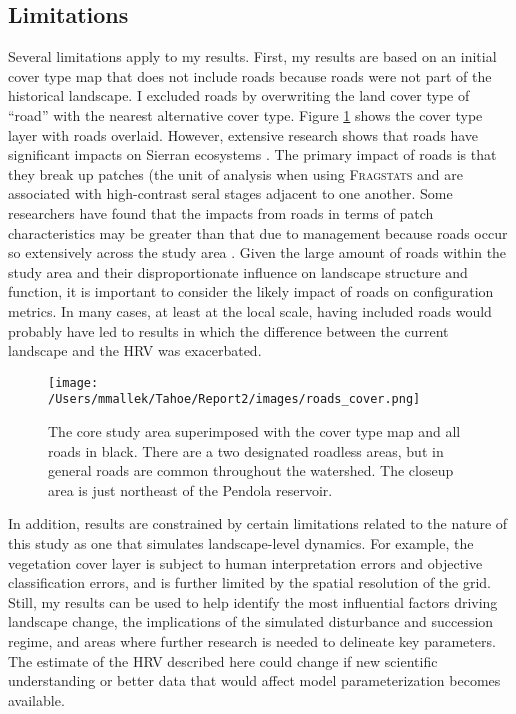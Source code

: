 \subsection{Limitations}
Several limitations apply to my results. First, my results are based on an initial cover type map that does not include roads because roads were not part of the historical landscape. I excluded roads by overwriting the land cover type of ``road'' with the nearest alternative cover type. Figure \ref{fig:roadcovermap} shows the cover type layer with roads overlaid. However, extensive research shows that roads have significant impacts on Sierran ecosystems \citep{Karr2004,Trombulak2000,Gucinski2001,Theobald2011}. The primary impact of roads is that they break up patches (the unit of analysis when using \textsc{Fragstats} and are associated with high-contrast seral stages adjacent to one another. Some researchers have found that the impacts from roads in terms of patch characteristics may be greater than that due to management because roads occur so extensively across the study area \citep{Gucinski2001,Tinker1998,Mcgarigal2001}. Given the large amount of roads within the study area and their disproportionate influence on landscape structure and function, it is important to consider the likely impact of roads on configuration metrics. In many cases, at least at the local scale, having included roads would probably have led to results in which the difference between the current landscape and the HRV was exacerbated.
%
\begin{figure}[!htbp]
  \centering
  \texttt{[image: /Users/mmallek/Tahoe/Report2/images/roads\_cover.png]}
  \caption{The core study area superimposed with the cover type map and all roads in black. There are a two designated roadless areas, but in general roads are common throughout the watershed. The closeup area is just northeast of the Pendola reservoir.} 
  \label{fig:roadcovermap}
\end{figure}
%

In addition, results are constrained by certain limitations related to the nature of this study as one that simulates landscape-level dynamics. For example, the vegetation cover layer is subject to human interpretation errors and objective classification errors, and is further limited by the spatial resolution of the grid. Still, my results can be used to help identify the most influential factors driving landscape change, the implications of the simulated disturbance and succession regime, and areas where further research is needed to delineate key parameters. The estimate of the HRV described here could change if new scientific understanding or better data that would affect model parameterization becomes available.

